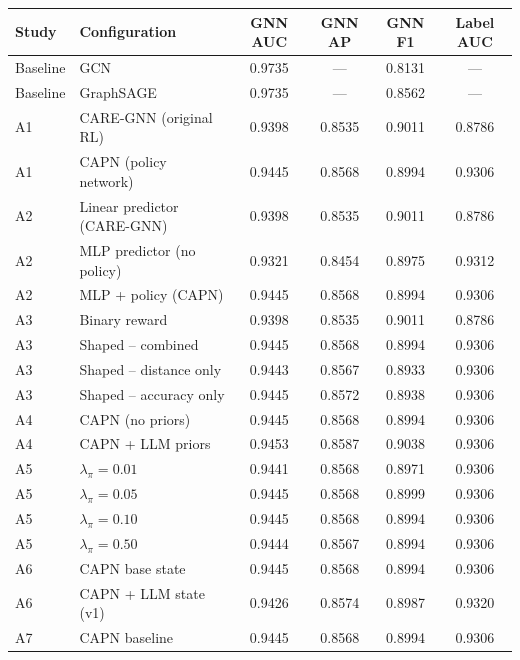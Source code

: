 \begin{table}[h!]
\centering
\begin{tabular}{llcccc}
\toprule
\textbf{Study} & \textbf{Configuration} & \textbf{GNN AUC} & \textbf{GNN AP} & \textbf{GNN F1} & \textbf{Label AUC} \\
\midrule
Baseline & GCN                        & 0.9735 & ---    & 0.8131 & --- \\
Baseline & GraphSAGE                  & 0.9735 & ---    & 0.8562 & --- \\
\midrule
A1 & CARE-GNN (original RL)          & 0.9398 & 0.8535 & 0.9011 & 0.8786 \\
A1 & CAPN (policy network)           & 0.9445 & 0.8568 & 0.8994 & 0.9306 \\
\midrule
A2 & Linear predictor (CARE-GNN)     & 0.9398 & 0.8535 & 0.9011 & 0.8786 \\
A2 & MLP predictor (no policy)        & 0.9321 & 0.8454 & 0.8975 & 0.9312 \\
A2 & MLP + policy (CAPN)              & 0.9445 & 0.8568 & 0.8994 & 0.9306 \\
\midrule
A3 & Binary reward                    & 0.9398 & 0.8535 & 0.9011 & 0.8786 \\
A3 & Shaped -- combined               & 0.9445 & 0.8568 & 0.8994 & 0.9306 \\
A3 & Shaped -- distance only          & 0.9443 & 0.8567 & 0.8933 & 0.9306 \\
A3 & Shaped -- accuracy only          & 0.9445 & 0.8572 & 0.8938 & 0.9306 \\
\midrule
A4 & CAPN (no priors)                 & 0.9445 & 0.8568 & 0.8994 & 0.9306 \\
A4 & CAPN + LLM priors                & 0.9453 & 0.8587 & 0.9038 & 0.9306 \\
\midrule
A5 & $\lambda_\pi = 0.01$             & 0.9441 & 0.8568 & 0.8971 & 0.9306 \\
A5 & $\lambda_\pi = 0.05$             & 0.9445 & 0.8568 & 0.8999 & 0.9306 \\
A5 & $\lambda_\pi = 0.10$             & 0.9445 & 0.8568 & 0.8994 & 0.9306 \\
A5 & $\lambda_\pi = 0.50$             & 0.9444 & 0.8567 & 0.8994 & 0.9306 \\
\midrule
A6 & CAPN base state                  & 0.9445 & 0.8568 & 0.8994 & 0.9306 \\
A6 & CAPN + LLM state (v1)            & 0.9426 & 0.8574 & 0.8987 & 0.9320 \\
\midrule
A7 & CAPN baseline                    & 0.9445 & 0.8568 & 0.8994 & 0.9306 \\

\end{tabular}
\end{table}

